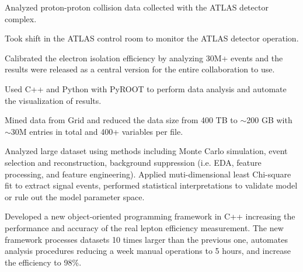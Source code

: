 \documentclass[letterpaper]{deedy-resume-openfont}
\begin{document}
\begin{tightemize}
\item Analyzed proton-proton collision data collected with the ATLAS detector complex.
\item Took shift in the ATLAS control room to monitor the ATLAS detector operation.
\item Calibrated the electron isolation efficiency by analyzing 30M+ events and the results were released as a central version for the entire collaboration to use.
\item Used C++ and Python with PyROOT to perform data analysis and automate the visualization of results.
\item Mined data from Grid and reduced the data size from 400 TB to $\sim$200 GB with $\sim$30M entries in total and 400+ variables per file.
\item Analyzed large dataset using methods including Monte Carlo simulation, event selection and reconstruction, background suppression (i.e. EDA, feature processing, and feature engineering). 
Applied muti-dimensional least Chi-square fit to extract signal events, performed statistical interpretations to validate model or rule out the model parameter space.
\item Developed a new object-oriented programming framework in C++ increasing the performance and accuracy of the real lepton efficiency measurement.
The new framework processes datasets 10 times larger than the previous one, automates analysis procedures reducing a week manual operations to 5 hours, and increase the efficiency to 98\%.


\end{tightemize}
\sectionsep
\end{document}
